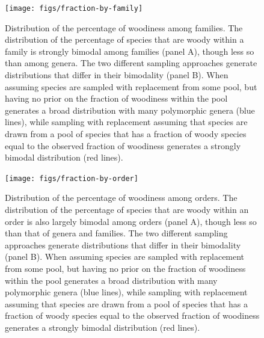 \documentclass[a4paper,12pt]{article}
\begin{document}
\clearpage
\renewcommand\thefigure{S.\arabic{figure}}
\renewcommand\thetable{S.\arabic{table}}
\setcounter{figure}{0}    
\setcounter{table}{0}

\begin{figure}[p]
  \centering
  \texttt{[image: figs/fraction-by-family]}
  \caption{Distribution of the percentage of woodiness among families.
    The distribution of the percentage of species that are woody within
    a family is strongly bimodal among families (panel A), though less
    so than among genera.
    The two different sampling approaches generate distributions that
    differ in their bimodality (panel B). When assuming species are
    sampled with replacement from some pool, but having no prior on
    the fraction of woodiness within the pool generates a broad
    distribution with many polymorphic genera (blue lines), while
    sampling with replacement assuming that species are drawn from a
    pool of species that has a fraction of woody species equal to the
    observed fraction of woodiness generates a strongly bimodal
    distribution (red lines).}
  \label{fig:distribution-family}
\end{figure}

\begin{figure}[p]
  \centering
  \texttt{[image: figs/fraction-by-order]}
  \caption{Distribution of the percentage of woodiness among orders.
    The distribution of the percentage of species that are woody within
    an order is also largely bimodal among orders (panel A), though
    less so than that of genera and families.
    The two different sampling approaches generate distributions that
    differ in their bimodality (panel B). When assuming species are
    sampled with replacement from some pool, but having no prior on
    the fraction of woodiness within the pool generates a broad
    distribution with many polymorphic genera (blue lines), while
    sampling with replacement assuming that species are drawn from a
    pool of species that has a fraction of woody species equal to the
    observed fraction of woodiness generates a strongly bimodal
    distribution (red lines).}
  \label{fig:distribution-order}
\end{figure}    
\end{document}

